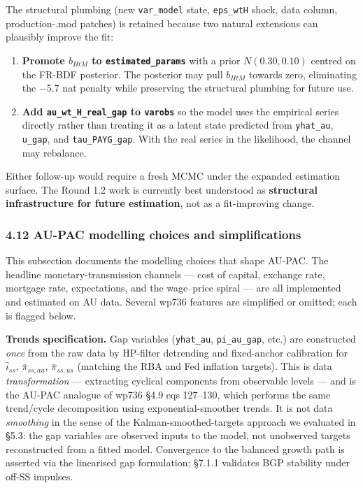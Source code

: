 \documentclass[
]{article}
\providecommand{\tightlist}{%
  \setlength{\itemsep}{0pt}\setlength{\parskip}{0pt}}
\begin{document}
The structural plumbing (new \texttt{var\_model} state,
\texttt{eps\_wtH} shock, data column, production-.mod patches) is
retained because two natural extensions can plausibly improve the fit:

\begin{enumerate}
\def\labelenumi{\arabic{enumi}.}
\tightlist
\item
  \textbf{Promote \(b_{HtM}\) to \texttt{estimated\_params}} with a
  prior \(N(0.30, 0.10)\) centred on the FR-BDF posterior. The posterior
  may pull \(b_{HtM}\) towards zero, eliminating the −5.7 nat penalty
  while preserving the structural plumbing for future use.
\item
  \textbf{Add \texttt{au\_wt\_H\_real\_gap} to \texttt{varobs}} so the
  model uses the empirical series directly rather than treating it as a
  latent state predicted from \texttt{yhat\_au}, \texttt{u\_gap}, and
  \texttt{tau\_PAYG\_gap}. With the real series in the likelihood, the
  channel may rebalance.
\end{enumerate}

Either follow-up would require a fresh MCMC under the expanded
estimation surface. The Round 1.2 work is currently best understood as
\textbf{structural infrastructure for future estimation}, not as a
fit-improving change.

\subsubsection{4.12 AU-PAC modelling choices and
simplifications}\label{au-pac-modelling-choices-and-simplifications}

This subsection documents the modelling choices that shape AU-PAC. The
headline monetary-transmission channels --- cost of capital, exchange
rate, mortgage rate, expectations, and the wage--price spiral --- are
all implemented and estimated on AU data. Several wp736 features are
simplified or omitted; each is flagged below.

\textbf{Trends specification.} Gap variables (\texttt{yhat\_au},
\texttt{pi\_au\_gap}, etc.) are constructed \emph{once} from the raw
data by HP-filter detrending and fixed-anchor calibration for
\(\bar{i}_{ss}\), \(\bar{\pi}_{ss,au}\), \(\bar{\pi}_{ss,us}\) (matching
the RBA and Fed inflation targets). This is data \emph{transformation}
--- extracting cyclical components from observable levels --- and is the
AU-PAC analogue of wp736 §4.9 eqs 127--130, which performs the same
trend/cycle decomposition using exponential-smoother trends. It is not
data \emph{smoothing} in the sense of the Kalman-smoothed-targets
approach we evaluated in §5.3: the gap variables are observed inputs to
the model, not unobserved targets reconstructed from a fitted model.
Convergence to the balanced growth path is asserted via the linearised
gap formulation; §7.1.1 validates BGP stability under off-SS impulses.
\end{document}
